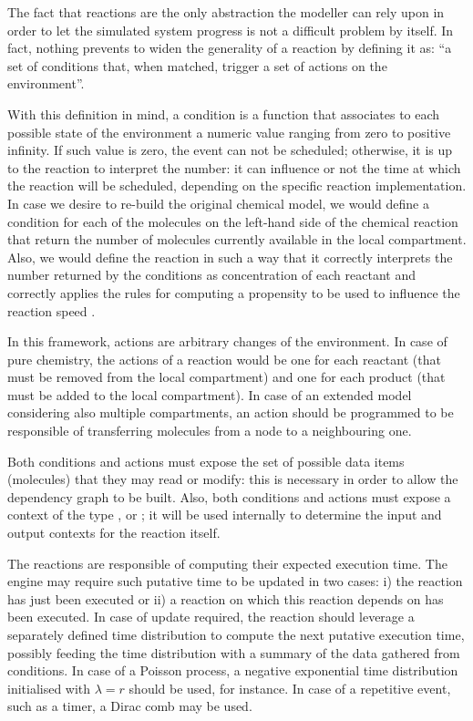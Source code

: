 \documentclass[12pt,a4paper,twoside,openright]{book}
\begin{document}
The fact that reactions are the only abstraction the modeller can rely upon in order to let the simulated system progress is not a difficult problem by itself.
%
In fact, nothing prevents to widen the generality of a reaction by defining it as: ``a set of conditions that, when matched, trigger a set of actions on the environment''.

With this definition in mind, a condition is a function that associates to each possible state of the environment a numeric value ranging from zero to positive infinity.
%
If such value is zero, the event can not be scheduled; otherwise, it is up to the reaction to interpret the number: it can influence or not the time at which the reaction will be scheduled, depending on the specific reaction implementation.
%
In case we desire to re-build the original chemical model, we would define a condition for each of the molecules on the left-hand side of the chemical reaction that return the number of molecules currently available in the local compartment.
%
Also, we would define the reaction in such a way that it correctly interprets the number returned by the conditions as concentration of each reactant and correctly applies the rules for computing a propensity to be used to influence the reaction speed \cite{gillespie1977}.

In this framework, actions are arbitrary changes of the environment.
%
In case of pure chemistry, the actions of a reaction would be one for each reactant (that must be removed from the local compartment) and one for each product (that must be added to the local compartment).
%
In case of an extended model considering also multiple compartments, an action should be programmed to be responsible of transferring molecules from a node to a neighbouring one.

Both conditions and actions must expose the set of possible data items (molecules) that they may read or modify: this is necessary in order to allow the dependency graph to be built.
%
Also, both conditions and actions must expose a context of the type \localc{}, \neighborhood{} or \globalc{}; it will be used internally to determine the input and output contexts for the reaction itself.

The reactions are responsible of computing their expected execution time.
%
The engine may require such putative time to be updated in two cases: i) the reaction has just been executed or ii) a reaction on which this reaction depends on has been executed.
%
In case of update required, the reaction should leverage a separately defined time distribution to compute the next putative execution time, possibly feeding the time distribution with a summary of the data gathered from conditions.
%
In case of a Poisson process, a negative exponential time distribution initialised with $\lambda{} = r$ should be used, for instance.
%
In case of a repetitive event, such as a timer, a Dirac comb may be used.
\end{document}
